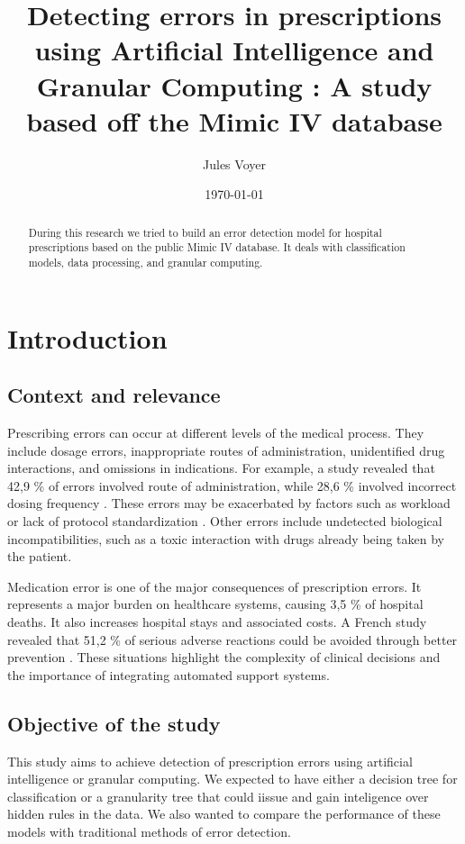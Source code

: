 \documentclass[a4paper,12pt]{article}
\title{Detecting errors in prescriptions using Artificial Intelligence and Granular Computing : A study based off the Mimic IV database}
\author{Jules Voyer}
\date{\today}
\begin{document}
\maketitle

\begin{abstract}
During this research we tried to build an error detection model for hospital prescriptions based on the public Mimic IV database. It deals with classification models, data processing, and granular computing.
\end{abstract}

\section{Introduction}
\subsection{Context and relevance}

Prescribing errors can occur at different levels of the medical process. They include dosage errors, inappropriate routes of administration, unidentified drug interactions, and omissions in indications. For example, a study revealed that 42,9 \% of errors involved route of administration, while 28,6 \% involved incorrect dosing frequency \cite{Ouzar2024}. These errors may be exacerbated by factors such as workload or lack of protocol standardization \cite{Unknown2022}.
Other errors include undetected biological incompatibilities, such as a toxic interaction with drugs already being taken by the patient.

Medication error is one of the major consequences of prescription errors. It represents a major burden on healthcare systems, causing 3,5 \% of hospital deaths. It also increases hospital stays and associated costs. A French study revealed that  51,2 \% of serious adverse reactions could be avoided through better prevention \cite{Unknown2022}. These situations highlight the complexity of clinical decisions and the importance of integrating automated support systems.

\subsection{Objective of the study}

This study aims to achieve detection of prescription errors using artificial intelligence or granular computing. We expected to have either a decision tree for classification or a granularity tree that could iissue and gain inteligence over hidden rules in the data. We also wanted to compare the performance of these models with traditional methods of error detection.
\end{document}
